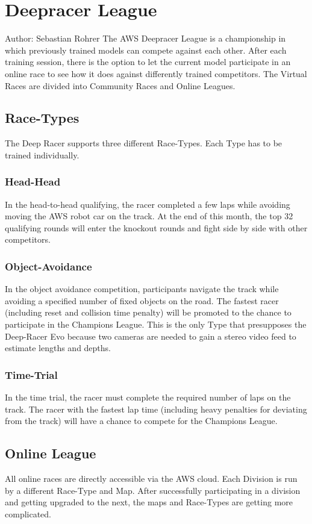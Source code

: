 \chapter{Deepracer League}
Author: Sebastian Rohrer\newline
The AWS Deepracer League is a championship in which previously trained models can compete against each other. After each training session, there is the option to let the current model participate in an online race to see how it does against differently trained competitors. The Virtual Races are divided into Community Races and Online Leagues.

\section{Race-Types}
The Deep Racer supports three different Race-Types. Each Type has to be trained individually.

\subsection{Head-Head}
In the head-to-head qualifying, the racer completed a few laps while avoiding moving the AWS robot car on the track. At the end of this month, the top 32 qualifying rounds will enter the knockout rounds and fight side by side with other competitors.

\subsection{Object-Avoidance}
In the object avoidance competition, participants navigate the track while avoiding a specified number of fixed objects on the road. The fastest racer (including reset and collision time penalty) will be promoted to the chance to participate in the Champions League. This is the only Type that presupposes the Deep-Racer Evo because two cameras are needed to gain a stereo video feed to estimate lengths and depths.

\subsection{Time-Trial}
In the time trial, the racer must complete the required number of laps on the track. The racer with the fastest lap time (including heavy penalties for deviating from the track) will have a chance to compete for the Champions League.

\section{Online League}
All online races are directly accessible via the AWS cloud. Each Division is run by a different Race-Type and Map. After successfully participating in a division and getting upgraded to the next, the maps and Race-Types are getting more complicated.


